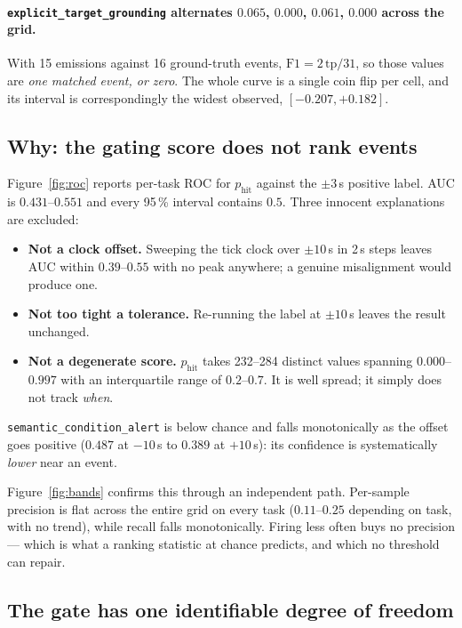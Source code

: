 \paragraph{\texttt{explicit\_target\_grounding} alternates $0.065$, $0.000$,
$0.061$, $0.000$ across the grid.} With 15 emissions against 16 ground-truth events,
$\mathrm{F1}=2\,\mathrm{tp}/31$, so those values are \emph{one matched event, or
zero}. The whole curve is a single coin flip per cell, and its interval is
correspondingly the widest observed, $[-0.207,+0.182]$.

\subsection{Why: the gating score does not rank events}

Figure~\ref{fig:roc} reports per-task ROC for $p_{\mathrm{hit}}$ against the
$\pm 3$\,s positive label. AUC is $0.431$--$0.551$ and every 95\,\% interval
contains $0.5$. Three innocent explanations are excluded:

\begin{itemize}
\item \textbf{Not a clock offset.} Sweeping the tick clock over $\pm 10$\,s in
      2\,s steps leaves AUC within $0.39$--$0.55$ with no peak anywhere; a genuine
      misalignment would produce one.
\item \textbf{Not too tight a tolerance.} Re-running the label at $\pm 10$\,s
      leaves the result unchanged.
\item \textbf{Not a degenerate score.} $p_{\mathrm{hit}}$ takes 232--284 distinct
      values spanning $0.000$--$0.997$ with an interquartile range of $0.2$--$0.7$.
      It is well spread; it simply does not track \emph{when}.
\end{itemize}

\texttt{semantic\_condition\_alert} is below chance and falls monotonically as the
offset goes positive ($0.487$ at $-10$\,s to $0.389$ at $+10$\,s): its confidence is
systematically \emph{lower} near an event.

Figure~\ref{fig:bands} confirms this through an independent path. Per-sample
precision is flat across the entire grid on every task ($0.11$--$0.25$ depending on
task, with no trend), while recall falls monotonically. Firing less often buys no
precision --- which is what a ranking statistic at chance predicts, and which no
threshold can repair.

\subsection{The gate has one identifiable degree of freedom}

